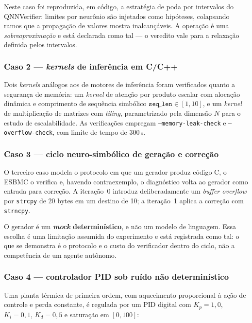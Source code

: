 Neste caso foi reproduzida, em código, a estratégia de poda por intervalos do QNNVerifier:
limites por neurônio são injetados como hipóteses, colapsando ramos que a propagação de
valores mostra inalcançáveis. A operação é uma \emph{sobreaproximação} e está declarada como
tal --- o veredito vale para a relaxação definida pelos intervalos.

\subsubsection{Caso 2 --- \textit{kernels} de inferência em C/C++}

Dois \textit{kernels} análogos aos de motores de inferência foram verificados quanto a
segurança de memória: um \textit{kernel} de atenção por produto escalar com alocação dinâmica
e comprimento de sequência simbólico $\texttt{seq\_len} \in [1,10]$, e um \textit{kernel} de
multiplicação de matrizes com \textit{tiling}, parametrizado pela dimensão $N$ para o estudo
de escalabilidade. As verificações empregam \texttt{--memory-leak-check} e
\texttt{--overflow-check}, com limite de tempo de 300\,s.

\subsubsection{Caso 3 --- ciclo neuro-simbólico de geração e correção}

O terceiro caso modela o protocolo em que um gerador produz código C, o ESBMC o verifica e,
havendo contraexemplo, o diagnóstico volta ao gerador como entrada para correção. A
iteração~0 introduz deliberadamente um \textit{buffer overflow} por \texttt{strcpy} de 20
bytes em um destino de 10; a iteração~1 aplica a correção com \texttt{strncpy}.

O gerador é um \textbf{\textit{mock} determinístico}, e não um modelo de linguagem. Essa
escolha é uma limitação assumida do experimento e está registrada como tal: o que se
demonstra é o protocolo e o custo do verificador dentro do ciclo, não a competência de um
agente autônomo.

\subsubsection{Caso 4 --- controlador PID sob ruído não determinístico}

Uma planta térmica de primeira ordem, com aquecimento proporcional à ação de controle e perda
constante, é regulada por um PID digital com $K_p = 1{,}0$, $K_i = 0{,}1$, $K_d = 0{,}5$ e
saturação em $[0, 100]$:

